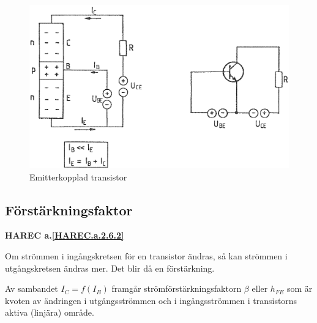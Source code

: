 \begin{figure}
\includegraphics[width=\textwidth]{images/cropped_pdfs/bild_2_2-18.pdf}
\caption{Emitterkopplad transistor}
\label{fig:BildII2-18}
\end{figure}

\subsection{Förstärkningsfaktor}
\textbf{HAREC a.\ref{HAREC.a.2.6.2}\label{myHAREC.a.2.6.2}}

Om strömmen i ingångskretsen för en transistor ändras, så kan strömmen i
utgångskretsen ändras mer. Det blir då en förstärkning.

Av sambandet \(I_C = f(I_B)\) framgår strömförstärkningsfaktorn \(\beta\) eller
\(h_{FE}\) som är kvoten av ändringen i utgångsströmmen och i ingångsströmmen i
transistorns aktiva (linjära) område.

